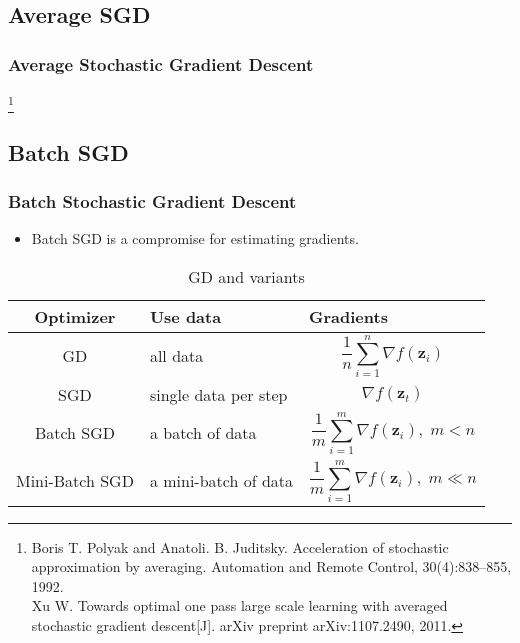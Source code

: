 \documentclass[10pt]{beamer}
\theoremstyle{mystyle}
\def\bb#1{\mathbf{#1}}
\newcommand{\bst}{\boldsymbol\theta}
\newcommand\blfootnote[1]{%
  \begingroup
  \renewcommand\thefootnote{}\footnote[frame]{#1}%
  \addtocounter{footnote}{-1}%
  \endgroup
}
\theoremstyle{mystyle}
\begin{document}
\subsection{Average SGD}
\begin{frame}
	\frametitle{Average Stochastic Gradient Descent}
	\blfootnote{Boris T. Polyak and Anatoli. B. Juditsky. Acceleration of stochastic approximation by averaging.
	Automation and Remote Control, 30(4):838–855, 1992.\\Xu W. Towards optimal one pass large scale learning with averaged stochastic gradient descent[J]. arXiv preprint arXiv:1107.2490, 2011.}
\end{frame}

\subsection{Batch SGD}
\begin{frame}
	\frametitle{Batch Stochastic Gradient Descent}
	\begin{itemize}
		\item Batch SGD is a compromise for estimating gradients.
	\end{itemize}
	\begin{table}
		{\renewcommand\arraystretch{1.4}
		\begin{tabular}{cll}
			\hline
			\bf Optimizer & \bf Use data & \bf Gradients \\ \hline
			GD & all data & $$ \frac1{n}\sum_{i=1}^n\nabla f(\bb z_i) $$ \\
			SGD & single data per step & $$ \nabla f(\bb z_t) $$ \\
			Batch SGD & a batch of data & $$ \frac1{m}\sum_{i=1}^m\nabla f(\bb z_i),\;m < n $$ \\
			Mini-Batch SGD & a mini-batch of data & $$ \frac1{m}\sum_{i=1}^m\nabla f(\bb z_i),\;m\ll n $$ \\ \hline
		\end{tabular}}
		\caption{GD and variants}
	\end{table}
\end{frame}
\end{document}
